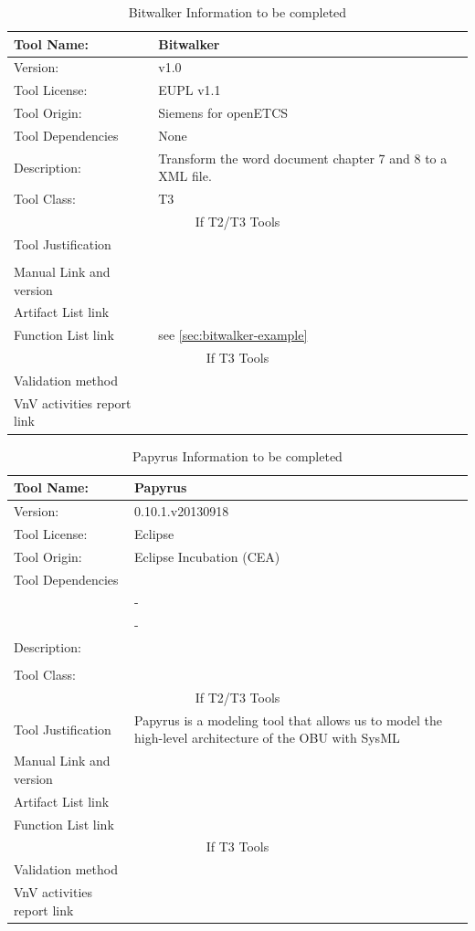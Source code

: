 \begin{table}[htbp]
\centering
\caption{\label{tbl:bitwalker-info}Bitwalker Information to be completed}
\begin{tabular}{|l|p{5cm}|}\hline
Tool Name: & Bitwalker \\\hline
Version: & v1.0\\\hline
Tool License: & EUPL v1.1 \\\hline
Tool Origin: & Siemens for openETCS\\\hline
Tool Dependencies & None\\ \hline
Description: & Transform the word document chapter 7 and 8 to a XML file. \\ \hline
Tool Class: & T3 \\\hline
\multicolumn{2}{|c|}{If T2/T3 Tools}\\\hline
Tool Justification & \\
 & \\ \hline
Manual Link and version & \\\hline
Artifact List link & \\\hline
Function List link& see \ref{sec:bitwalker-example} \\\hline
\multicolumn{2}{|c|}{If T3 Tools}\\\hline
Validation method& \\\hline
VnV activities report link&\\\hline
\end{tabular}
\end{table}
\begin{table}[htbp]
\centering
\caption{\label{tbl:papyrus-info} Papyrus Information to be completed}
\begin{tabular}{|l|p{5cm}|}\hline
Tool Name: & Papyrus  \\\hline
Version: &  0.10.1.v20130918 \\\hline
Tool License: & Eclipse \\\hline
Tool Origin: &  Eclipse Incubation (CEA)\\\hline
Tool Dependencies & \\
 & -\\
 & -\\ \hline
Description: & \\
 & \\ \hline
Tool Class: & \\\hline
\multicolumn{2}{|c|}{If T2/T3 Tools}\\\hline
Tool Justification &Papyrus is a modeling tool that allows us
    to model the high-level architecture of the OBU with SysML \\ \hline
Manual Link and version & \\\hline
Artifact List link & \\\hline
Function List link& \\\hline
\multicolumn{2}{|c|}{If T3 Tools}\\\hline
Validation method& \\\hline
VnV activities report link&\\\hline
\end{tabular}
\end{table}
